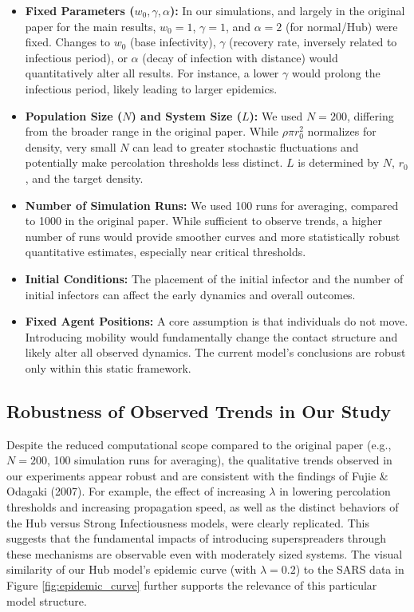 \documentclass{article}
\begin{document}
\begin{itemize}
    \item \textbf{Fixed Parameters ($w_0, \gamma, \alpha$):} In our simulations, and largely in the original paper for the main results, $w_0=1$, $\gamma=1$, and $\alpha=2$ (for normal/Hub) were fixed. Changes to $w_0$ (base infectivity), $\gamma$ (recovery rate, inversely related to infectious period), or $\alpha$ (decay of infection with distance) would quantitatively alter all results. For instance, a lower $\gamma$ would prolong the infectious period, likely leading to larger epidemics.
    \item \textbf{Population Size ($N$) and System Size ($L$):} We used $N=200$, differing from the broader range in the original paper. While $\rho\pi r_0^2$ normalizes for density, very small $N$ can lead to greater stochastic fluctuations and potentially make percolation thresholds less distinct. $L$ is determined by $N$, $r_0$, and the target density.
    \item \textbf{Number of Simulation Runs:} We used 100 runs for averaging, compared to 1000 in the original paper. While sufficient to observe trends, a higher number of runs would provide smoother curves and more statistically robust quantitative estimates, especially near critical thresholds.
    \item \textbf{Initial Conditions:} The placement of the initial infector and the number of initial infectors can affect the early dynamics and overall outcomes.
    \item \textbf{Fixed Agent Positions:} A core assumption is that individuals do not move. Introducing mobility would fundamentally change the contact structure and likely alter all observed dynamics. The current model's conclusions are robust only within this static framework.
\end{itemize}

\subsection{Robustness of Observed Trends in Our Study}
\label{sec:sensitivity_robustness}

Despite the reduced computational scope compared to the original paper (e.g., $N=200$, 100 simulation runs for averaging), the qualitative trends observed in our experiments appear robust and are consistent with the findings of Fujie \& Odagaki (2007). For example, the effect of increasing $\lambda$ in lowering percolation thresholds and increasing propagation speed, as well as the distinct behaviors of the Hub versus Strong Infectiousness models, were clearly replicated. This suggests that the fundamental impacts of introducing superspreaders through these mechanisms are observable even with moderately sized systems. The visual similarity of our Hub model's epidemic curve (with $\lambda=0.2$) to the SARS data in Figure \ref{fig:epidemic_curve} further supports the relevance of this particular model structure.
\end{document}
